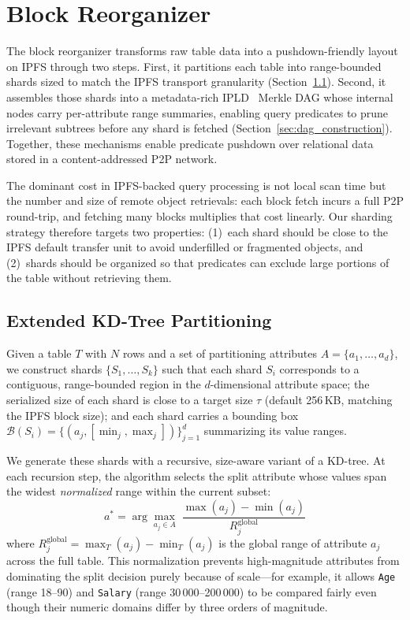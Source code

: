 \section{Block Reorganizer}
\label{sec:pushdown}
 
The block reorganizer transforms raw table data into a pushdown-friendly layout on IPFS through two steps. First, it partitions each table into range-bounded shards sized to match the IPFS transport granularity (Section~\ref{sec:partitioning}). Second, it assembles those shards into a metadata-rich IPLD~\cite{ipld2023spec} Merkle DAG whose internal nodes carry per-attribute range summaries, enabling query predicates to prune irrelevant subtrees before any shard is fetched (Section~\ref{sec:dag_construction}). Together, these mechanisms enable predicate pushdown over relational data stored in a content-addressed P2P network.
 
The dominant cost in IPFS-backed query processing is not local scan time but the number and size of remote object retrievals: each block fetch incurs a full P2P round-trip, and fetching many blocks multiplies that cost linearly. Our sharding strategy therefore targets two properties: (1)~each shard should be close to the IPFS default transfer unit to avoid underfilled or fragmented objects, and (2)~shards should be organized so that predicates can exclude large portions of the table without retrieving them.
 
\subsection{Extended KD-Tree Partitioning}
\label{sec:partitioning}
 
Given a table $T$ with $N$ rows and a set of partitioning attributes $A = \{a_1, \ldots, a_d\}$, we construct shards $\{S_1, \ldots, S_k\}$ such that each shard $S_i$ corresponds to a contiguous, range-bounded region in the $d$-dimensional attribute space; the serialized size of each shard is close to a target size $\tau$ (default 256\,KB, matching the IPFS block size); and each shard carries a bounding box $\mathcal{B}(S_i) = \{(a_j, [\min_j, \max_j])\}_{j=1}^{d}$ summarizing its value ranges.
 
We generate these shards with a recursive, size-aware variant of a KD-tree. At each recursion step, the algorithm selects the split attribute whose values span the widest \emph{normalized} range within the current subset:
\begin{equation}
    a^* = \arg\max_{a_j \in A} \; \frac{\max(a_j) - \min(a_j)}{R_j^{\text{global}}}
    \label{eq:split_attr}
\end{equation}
where $R_j^{\text{global}} = \max_T(a_j) - \min_T(a_j)$ is the global range of attribute $a_j$ across the full table. This normalization prevents high-magnitude attributes from dominating the split decision purely because of scale---for example, it allows \texttt{Age} (range 18--90) and \texttt{Salary} (range 30\,000--200\,000) to be compared fairly even though their numeric domains differ by three orders of magnitude.
 
